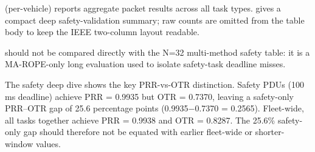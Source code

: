  (per-vehicle) reports aggregate packet results across all task types.  gives a compact deep safety-validation summary; raw counts are omitted from the table body to keep the IEEE two-column layout readable.

\begin{table}[htbp]
\caption{Compact Per-Message-Type Deadline Analysis (N=8 deep safety validation, MA-ROPE full policy)}
\label{tab:deadline_analysis}
\centering
{}
\end{table}

 should not be compared directly with the N=32 multi-method safety table: it is a MA-ROPE-only long evaluation used to isolate safety-task deadline misses.

The safety deep dive shows the key PRR-vs-OTR distinction. Safety PDUs (100 ms deadline) achieve PRR = 0.9935 but OTR = 0.7370, leaving a safety-only PRR--OTR gap of 25.6 percentage points (0.9935$-$0.7370 = 0.2565). Fleet-wide, all tasks together achieve PRR = 0.9938 and OTR = 0.8287. The 25.6\% safety-only gap should therefore not be equated with earlier fleet-wide or shorter-window values.
